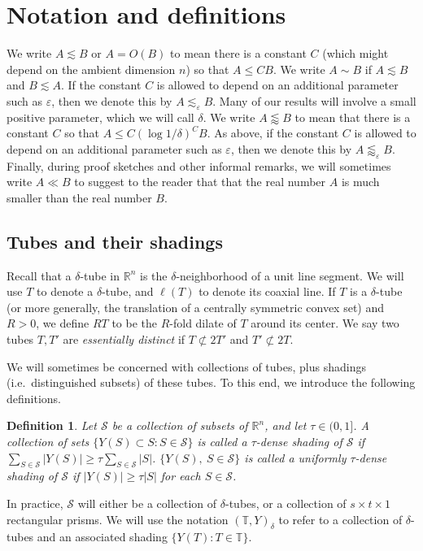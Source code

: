 \documentclass[letterpaper, reqno,11pt]{article}
\numberwithin{equation}{section}
\newcommand{\RR}{\mathbb{R}}
\newcommand{\eps}{\varepsilon}
\newcommand{\tubes}{\mathbb{T}}
\numberwithin{thm}{section}
\newtheorem{defn}[thm]{Definition}
\theoremstyle{remark}
\begin{document}

\section{Notation and definitions}\label{notationDefinitionsSection}


We write $A\lesssim B$ or $A = O(B)$ to mean there is a constant $C$ (which might depend on the ambient dimension $n$) so that $A\leq CB$. We write $A\sim B$ if $A\lesssim B$ and $B\lesssim A$. If the constant $C$ is allowed to depend on an additional parameter such as $\eps$, then we denote this by $A\lesssim_\eps B$.  Many of our results will involve a small positive parameter, which we will call $\delta$. We write $A\lessapprox B$ to mean that there is a constant $C$ so that $A\leq C (\log 1/\delta)^C B$. As above, if the constant $C$ is allowed to depend on an additional parameter such as $\eps$, then we denote this by $A\lessapprox_\eps B$. Finally, during proof sketches and other informal remarks, we will sometimes write $A \ll B$ to suggest to the reader that that the real number $A$ is much smaller than the real number $B$. 


\subsection{Tubes and their shadings}\label{tubesAndShadingsSection}
Recall that a $\delta$-tube in $\RR^n$ is the $\delta$-neighborhood of a unit line segment. We will use $T$ to denote a $\delta$-tube, and $\ell(T)$ to denote its coaxial line. If $T$ is a $\delta$-tube (or more generally, the translation of a centrally symmetric convex set) and $R>0$, we define $RT$ to be the $R$-fold dilate of $T$ around its center. We say two tubes $T,T'$ are \emph{essentially distinct} if $T\not\subset 2T'$ and $T'\not\subset 2T$.

We will sometimes be concerned with collections of tubes, plus shadings (i.e.~distinguished subsets) of these tubes. To this end, we introduce the following definitions. 
\begin{defn}\label{def: uniform}
Let $\mathcal{S}$ be a collection of subsets of $\RR^n$, and let $\tau\in (0,1]$. A collection of sets $\{Y(S)\subset S\colon S\in\mathcal{S}\}$ is called a  \emph{$\tau$-dense shading} of $\mathcal{S}$ if $\sum_{S\in\mathcal{S}} |Y(S)|\geq\tau\sum_{S\in\mathcal{S}}|S|$. $\{Y(S),\ S\in\mathcal{S}\}$ is called a \emph{uniformly $\tau$-dense shading} of $\mathcal{S}$ if $|Y(S)|\geq\tau|S|$ for each $S\in\mathcal{S}$. 
\end{defn}
In practice, $\mathcal{S}$ will either be a collection of $\delta$-tubes, or a collection of $s\times t\times 1$ rectangular prisms. We will use the notation $(\tubes,Y)_\delta$ to refer to a collection of $\delta$-tubes and an associated shading $\{Y(T)\colon T\in\tubes\}$. 
\end{document}
